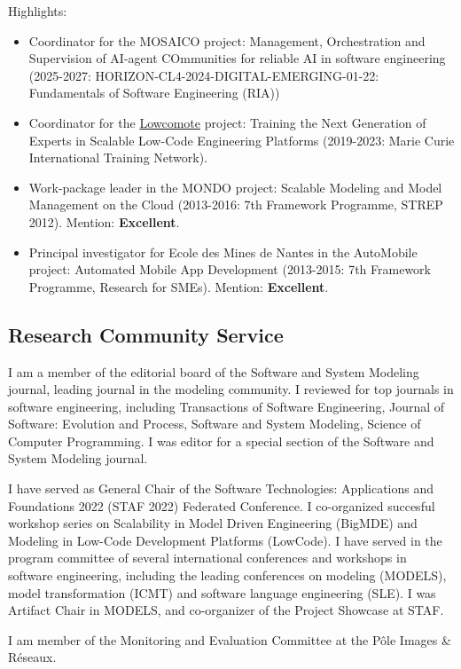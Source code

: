 \medskip
Highlights:
 \begin{itemize}
 \item Coordinator for the MOSAICO project: Management, Orchestration and Supervision of AI-agent COmmunities
 for reliable AI in software engineering (2025-2027: HORIZON-CL4-2024-DIGITAL-EMERGING-01-22: Fundamentals of Software Engineering (RIA))
 \item Coordinator for the \href{https://www.lowcomote.eu/}{Lowcomote} project: Training the Next Generation of Experts in Scalable Low-Code Engineering Platforms (2019-2023: Marie Curie International Training Network).
 \item Work-package leader in the MONDO project: Scalable Modeling and Model Management on the Cloud (2013-2016: 7th Framework Programme, STREP 2012). Mention: \textbf{Excellent}.
 \item Principal investigator for Ecole des Mines de Nantes in the AutoMobile project: Automated Mobile App Development (2013-2015: 7th Framework Programme, Research for SMEs). Mention: \textbf{Excellent}.
\end{itemize}

\subsection*{Research Community Service}

I am a member of the editorial board of the Software and System Modeling journal, leading journal in the modeling community. I reviewed for top journals in software engineering, including Transactions of Software Engineering, Journal of Software: Evolution and Process, Software and System Modeling, Science of Computer Programming. I was editor for a special section of the Software and System Modeling journal.

I have served as General Chair of the Software Technologies: Applications and Foundations 2022 (STAF 2022) Federated Conference. I co-organized succesful workshop series on Scalability in Model Driven Engineering (BigMDE) and Modeling in Low-Code Development Platforms (LowCode). 
I have served in the program committee of several international conferences and workshops in software engineering, including the leading conferences on modeling (MODELS), model transformation (ICMT) and software language engineering (SLE). I was Artifact Chair in MODELS, and co-organizer of the Project Showcase at STAF.

I am member of the Monitoring and Evaluation Committee at the Pôle Images \& Réseaux.

